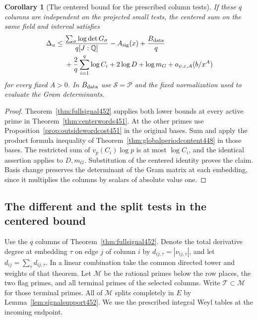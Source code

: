 \documentclass[a4paper,11pt]{article}
\newtheorem{corollary}[proposition]{Corollary}
\theoremstyle{definition}
\theoremstyle{remark}
\numberwithin{equation}{section}
\begin{document}
\begin{corollary}[The centered bound for the prescribed column tests]\leavevmode
\label{cor:fullcenter452}
If these \(q\) columns are independent on the projected small
tests, the centered sum on the same field and interval satisfies
\[
 \begin{split}
 \Delta_u\le{}&
   \frac{\sum_\sigma\log\det G_\sigma}{q[J:\mathbb Q]}
        -A_{\rm sig}(x)+\frac{B_{\rm data}}q\\
   &+\frac{2}{q}\sum_{i=1}^{q}\log C_i
        +2\log D+\log m_G+o_{\psi,\varepsilon,A}(b/x^A)
 \end{split}
\]
for every fixed \(A>0\). In \(B_{\rm data}\) use
\(\mathcal S=\mathcal P\) and the fixed normalization used to
evaluate the Gram determinants.
\end{corollary}
\begin{proof}
Theorem~\ref{thm:fullsignal452} supplies both lower bounds at
every active prime in Theorem~\ref{thm:centerwords451}.
At the other primes use Proposition~\ref{prop:outsidewordcost451}
in the original bases. Sum and apply the product formula
inequality of Theorem~\ref{thm:globalperiodcontent448} in
those bases. The restricted sum of \(v_p(C_i)\log p\) is at
most \(\log C_i\), and the identical assertion applies to
\(D,m_G\). Substitution of the centered identity proves the
claim. Basis change preserves the determinant of the Gram matrix
at each embedding, since it multiplies the columns by scalars
of absolute value one.
\end{proof}


\subsection{The different and the split tests in the centered bound}
\label{sec:outsideprimeperiods453}

Use the \(q\) columns of Theorem~\ref{thm:fullsignal452}. Denote
the total derivative degree at embedding \(\tau\) on edge \(j\)
of column \(i\) by \(d_{ij,\tau}=|\nu_{ij,\tau}|\), and let
\(d_{ij}=\sum_\tau d_{ij,\tau}\). In a linear combination take
the common directed tower and weights of that theorem.
Let \(\mathcal M\) be the rational primes below the row places,
the two flag primes, and all terminal primes of the selected
columns. Write \(\mathcal T\subset\mathcal M\) for those terminal
primes. All of \(\mathcal M\) splits completely in \(E\) by
Lemma~\ref{lem:signalsupport452}. We use the prescribed integral
Weyl tables at the incoming endpoint.
\end{document}
